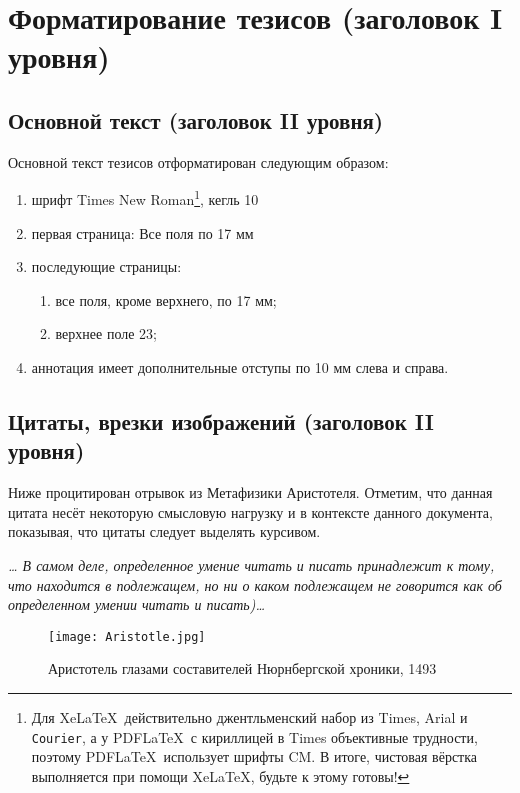 \documentclass{spisok-article}
\begin{document}
\section{Форматирование тезисов (заголовок I уровня)}

\subsection{Основной текст (заголовок II уровня)}

Основной текст тезисов отформатирован следующим образом:

\begin{enumerate}
\item
  шрифт Times New Roman\footnote{Для Xe\LaTeX ~действительно
  джентльменский набор из Times, \textsf{Arial} и \texttt{Courier},
  а у PDF\LaTeX ~с кириллицей в Times объективные трудности, поэтому
  PDF\LaTeX ~использует шрифты CM.  В итоге, чистовая вёрстка
  выполняется при помощи Xe\LaTeX, будьте к этому готовы!}, кегль 10
\item
  первая страница: Все поля по 17 мм
\item
  последующие страницы:

  \begin{enumerate}
  \item
    все поля, кроме верхнего, по 17 мм;
  \item
    верхнее поле 23;
  \end{enumerate}
\item
  аннотация имеет дополнительные отступы по 10 мм слева и справа.
\end{enumerate}

\subsection{Цитаты, врезки изображений (заголовок II уровня)}

Ниже процитирован отрывок из Метафизики Аристотеля. Отметим, что
данная цитата несёт некоторую смысловую нагрузку и в контексте данного
документа, показывая, что цитаты следует выделять курсивом.

\emph{\ldots{} В самом деле, определенное умение читать и писать
  принадлежит к тому, что находится в подлежащем, но ни о каком
  подлежащем не говорится как об определенном умении читать и
  писать)\ldots}

\begin{figure}[h]
\begin{center}
\texttt{[image: Aristotle.jpg]}
\end{center}
\caption{Аристотель глазами составителей Нюрнбергской хроники,
  1493}\label{fig:aristotle}
\end{figure}
\end{document}

